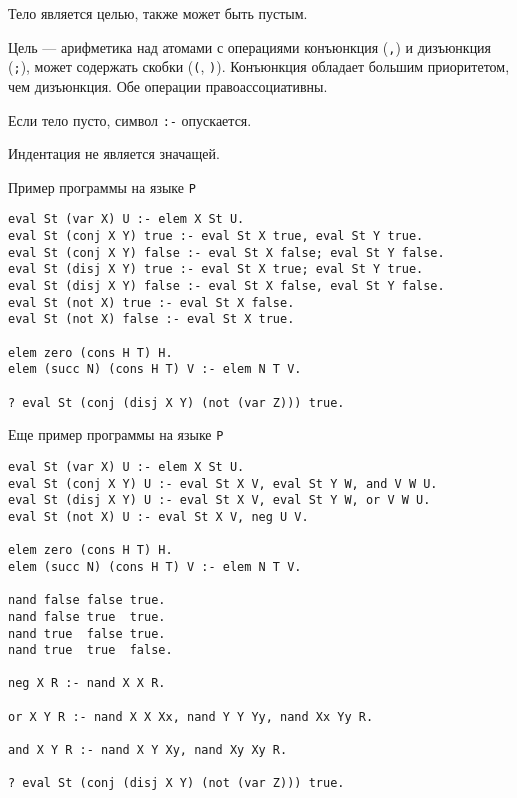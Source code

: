 \documentclass[12pt]{article}
\begin{document}
Тело является целью, также может быть пустым.

Цель --- арифметика над атомами с операциями конъюнкция (\verb!,!) и дизъюнкция (\verb!;!), может содержать скобки (\verb!(!, \verb!)!). Конъюнкция обладает большим приоритетом, чем дизъюнкция. Обе операции правоассоциативны.

Если тело пусто, символ \verb!:-! опускается.

Индентация не является значащей.

\newpage


\begin{center}
    \Large{Пример программы на языке \verb!P!}
\end{center}

\begin{verbatim}
eval St (var X) U :- elem X St U.
eval St (conj X Y) true :- eval St X true, eval St Y true.
eval St (conj X Y) false :- eval St X false; eval St Y false.
eval St (disj X Y) true :- eval St X true; eval St Y true.
eval St (disj X Y) false :- eval St X false, eval St Y false.
eval St (not X) true :- eval St X false.
eval St (not X) false :- eval St X true.

elem zero (cons H T) H.
elem (succ N) (cons H T) V :- elem N T V.

? eval St (conj (disj X Y) (not (var Z))) true.
\end{verbatim}

\begin{center}
  \Large{Еще пример программы на языке \verb!P!}
\end{center}

\begin{verbatim}
eval St (var X) U :- elem X St U.
eval St (conj X Y) U :- eval St X V, eval St Y W, and V W U.
eval St (disj X Y) U :- eval St X V, eval St Y W, or V W U.
eval St (not X) U :- eval St X V, neg U V.

elem zero (cons H T) H.
elem (succ N) (cons H T) V :- elem N T V.

nand false false true.
nand false true  true.
nand true  false true.
nand true  true  false.

neg X R :- nand X X R.

or X Y R :- nand X X Xx, nand Y Y Yy, nand Xx Yy R.

and X Y R :- nand X Y Xy, nand Xy Xy R.

? eval St (conj (disj X Y) (not (var Z))) true.
\end{verbatim}
\end{document}
